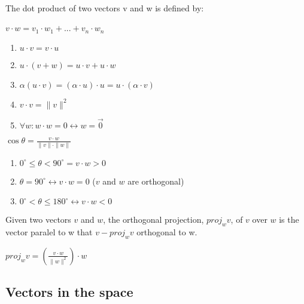 \begin{definition}
  The dot product of two vectors v and w is defined by: \\ \\
  $v \cdot w = v_{\scriptstyle{1}} \cdot w_{\scriptstyle{1}} + ... + v_{\scriptstyle{n}} \cdot w_{\scriptstyle{n}}$
\end{definition}

\begin{theorem}
  \hspace{10em}
  \begin{enumerate}
    \item $u \cdot v = v \cdot u$
    \item $u \cdot (v + w) = u \cdot v + u \cdot w$
    \item $\alpha (u \cdot v) = (\alpha \cdot u) \cdot u = u \cdot (\alpha \cdot v)$
    \item $v \cdot v = \|v\| ^ 2$
    \item $\forall w: w \cdot w = 0 \leftrightarrow w = \vec{0}$
  \end{enumerate}
\end{theorem}

\begin{theorem}
  $\cos \theta = \frac{v \cdot w}{\|v\| \cdot \|w\|}$ 
  \begin{enumerate}
    \item $0^\circ \leq \theta < 90^\circ =  v \cdot w > 0$ 
    \item $\theta = 90^\circ \leftrightarrow v \cdot w = 0$ ($v$ and $w$ are orthogonal) 
    \item $0^\circ < \theta \leq 180^\circ \leftrightarrow v \cdot w < 0$
  \end{enumerate}
\end{theorem}

\begin{definition}
  Given two vectors $v$ and $w$, the orthogonal projection, $proj_{\scriptstyle{w}}v$, of $v$ over $w$ is the vector paralel to w that $v - proj_{\scriptstyle{w}}v$ orthogonal to w. 
  \begin{theorem}
    $proj_{\scriptstyle{w}}v = (\frac{v \cdot w}{\| w \|^2}) \cdot w$
  \end{theorem}
\end{definition}

\vspace{10em}

\subsection{Vectors in the space}

